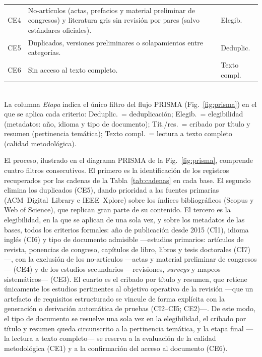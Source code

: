 \documentclass[10pt,journal,twoside,letterpaper]{IEEEtran}
\begin{document}
\begin{table}[!tb]
\begin{tabular}{@{}l>{\raggedright\arraybackslash}p{}l@{}}
			CE4 & No-artículos (actas, prefacios y material preliminar de congresos) y literatura gris sin revisión por pares (salvo estándares oficiales). & Elegib. \\
			CE5 & Duplicados, versiones preliminares o solapamientos entre categorías. & Deduplic. \\
			CE6 & Sin acceso al texto completo. & Texto compl. \\
			\bottomrule
		\end{tabular}
		\\[3pt]
		{\footnotesize La columna \emph{Etapa} indica el único filtro del flujo PRISMA (Fig.~\ref{fig:prisma}) en el que se aplica cada criterio: Deduplic.\ = deduplicación; Elegib.\ = elegibilidad (metadatos: año, idioma y tipo de documento); Tít./res.\ = cribado por título y resumen (pertinencia temática); Texto compl.\ = lectura a texto completo (calidad metodológica).}
	\end{table}

	El proceso, ilustrado en el diagrama PRISMA de la Fig.~\ref{fig:prisma}, comprende cuatro filtros consecutivos. El primero es la identificación de los registros recuperados por las cadenas de la Tabla~\ref{tab:cadenas} en cada base. El segundo elimina los duplicados (CE5), dando prioridad a las fuentes primarias (ACM~Digital~Library e IEEE~Xplore) sobre los índices bibliográficos (Scopus y Web of Science), que replican gran parte de su contenido. El tercero es la elegibilidad, en la que se aplican de una sola vez, y sobre los metadatos de las bases, todos los criterios formales: año de publicación desde 2015 (CI1), idioma inglés (CI6) y tipo de documento admisible ---estudios primarios: artículos de revista, ponencias de congreso, capítulos de libro, libros y tesis doctorales (CI7)---, con la exclusión de los no-artículos ---actas y material preliminar de congresos--- (CE4) y de los estudios secundarios ---revisiones, \emph{surveys} y mapeos sistemáticos--- (CE3). El cuarto es el cribado por título y resumen, que retiene únicamente los estudios pertinentes al objetivo operativo de la revisión ---que un artefacto de requisitos estructurado se vincule de forma explícita con la generación o derivación automática de pruebas (CI2--CI5; CE2)---. De este modo, el tipo de documento se resuelve una sola vez en la elegibilidad, el cribado por título y resumen queda circunscrito a la pertinencia temática, y la etapa final ---la lectura a texto completo--- se reserva a la evaluación de la calidad metodológica (CE1) y a la confirmación del acceso al documento (CE6).
\end{document}
